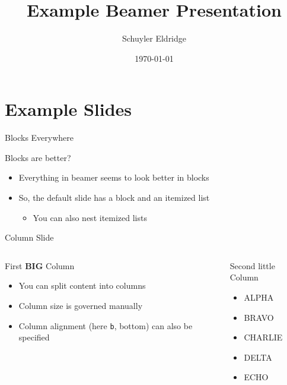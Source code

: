 \documentclass{beamer}
\title[Example Presentation]{Example Beamer Presentation}
\author[schuyler.eldridge@gmail.com]{Schuyler Eldridge}
\date[\today]{\today}
\begin{document}
\maketitle

\section*{Example Slides}

\begin{frame}{Blocks Everywhere}
  \begin{block}{Blocks are better?}
    \begin{itemize}
    \item Everything in beamer seems to look better in blocks
    \item So, the default slide has a block and an itemized list
      \begin{itemize}
      \item You can also nest itemized lists
      \end{itemize}
    \end{itemize}
  \end{block}
\end{frame}

\begin{frame}{Column Slide}
  \begin{columns}[b]
    \begin{block}{First \textbf{BIG} Column}
      \begin{itemize}
      \item You can split content into columns
      \item Column size is governed manually
      \item Column alignment (here \texttt{b}, bottom) can also be specified
      \end{itemize}
    \end{block}

    \begin{block}{Second {\tiny little} Column}
      \begin{itemize}
      \item ALPHA
      \item BRAVO
      \item CHARLIE
      \item DELTA
      \item ECHO
      \end{itemize}
    \end{block}
  \end{columns}
\end{frame}
\end{document}
